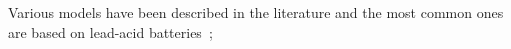 \documentclass[review]{elsarticle}
\begin{document}
  
Various models have been described in the literature and the most common ones are based on lead-acid batteries~\cite{Copetti,Pinho};
%
%
%
\end{document}
